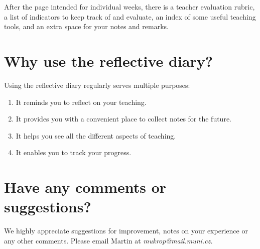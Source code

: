 After the page intended for individual weeks, there is a teacher evaluation rubric, a list of indicators to keep track of and evaluate, an index of some useful teaching tools, and an extra space for your notes and remarks.

\section*{Why use the reflective diary?}

Using the reflective diary regularly serves multiple purposes:
\begin{enumerate}[topsep=0pt]
\item It reminds you to reflect on your teaching.
\item It provides you with a convenient place to collect notes for the future.
\item It helps you see all the different aspects of teaching.
\item It enables you to track your progress.
\end{enumerate}

\section*{Have any comments or suggestions?}

We highly appreciate suggestions for improvement, notes on your experience or any other comments. Please email Martin at \textit{mukrop@mail.muni.cz.}
